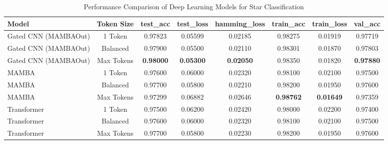 \begin{table}[htbp]
  \centering
  \caption{Performance Comparison of Deep Learning Models for Star Classification}
  \label{tab:model_comparison}
  \begin{tabular}{lccccccc}
    \toprule
    Model & Token Size & test\_acc & test\_loss & hamming\_loss & train\_acc & train\_loss & val\_acc \\
    \midrule
    Gated CNN (MAMBAOut) & 1 Token & 0.97823 & 0.05599 & 0.02185 & 0.98275 & 0.01919 & 0.97719 \\
    Gated CNN (MAMBAOut) & Balanced & 0.97900 & 0.05500 & 0.02110 & 0.98301 & 0.01870 & 0.97803 \\
    Gated CNN (MAMBAOut) & Max Tokens & \textbf{0.98000} & \textbf{0.05300} & \textbf{0.02050} & 0.98350 & 0.01820 & \textbf{0.97880} \\
    MAMBA & 1 Token & 0.97600 & 0.06000 & 0.02320 & 0.98100 & 0.02100 & 0.97500 \\
    MAMBA & Balanced & 0.97700 & 0.05800 & 0.02210 & 0.98200 & 0.01950 & 0.97600 \\
    MAMBA & Max Tokens & 0.97299 & 0.06882 & 0.02646 & \textbf{0.98762} & \textbf{0.01649} & 0.97359 \\
    Transformer & 1 Token & 0.97500 & 0.06200 & 0.02420 & 0.98000 & 0.02200 & 0.97400 \\
    Transformer & Balanced & 0.97600 & 0.06000 & 0.02320 & 0.98100 & 0.02100 & 0.97500 \\
    Transformer & Max Tokens & 0.97700 & 0.05800 & 0.02230 & 0.98200 & 0.01950 & 0.97600 \\
    \bottomrule
  \end{tabular}
\end{table}